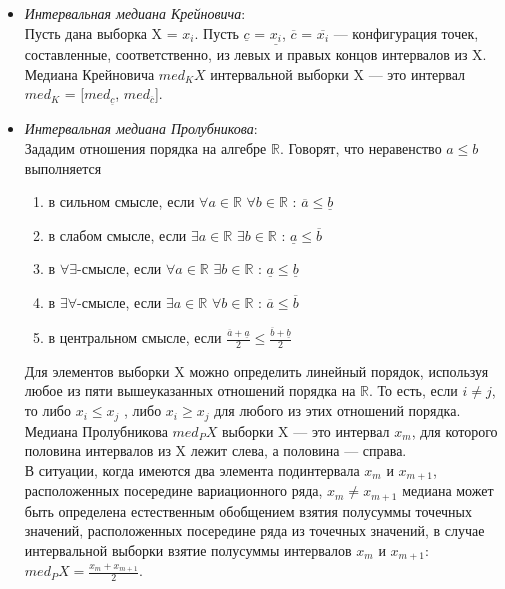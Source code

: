 \documentclass[a4paper,12pt]{article}
\begin{document}
\begin{itemize}
\item \textit{Интервальная медиана Крейновича}:\\
Пусть дана выборка X = {$x_i$}. Пусть $\underline{c}$ = {$\underline{x_i}$}, $\overline{c}$ = {$\overline{x_i}$} — конфигурация точек, составленные, соответственно, из левых и правых концов интервалов из X. Медиана Крейновича $med_{K}X$ интервальной выборки X — это интервал\\ $med_K$ = [$med_{\underline{c}}$, $med_{\overline{c}}$].

\item \textit{Интервальная медиана Пролубникова}:\\
Зададим отношения порядка на алгебре $\mathbb{R}$. Говорят, что неравенство $a \leq b$ выполняется\\
\begin{enumerate}
    \item в сильном смысле, если $\forall a \in \mathbb{R}$ $ \forall b \in \mathbb{R}$ : $\overline{a} \leq \underline{b}$
    \item в слабом смысле, если $\exists a \in \mathbb{R}$ $ \exists b \in \mathbb{R}$ : $\underline{a} \leq \overline{b}$
    \item в $\forall \exists$-смысле, если $\forall a \in \mathbb{R} $ $ \exists b \in \mathbb{R}$ : $\underline{a} \leq \underline{b}$
    \item в $\exists \forall$-смысле, если $\exists a \in \mathbb{R}$ $\forall b \in \mathbb{R}$ : $\overline{a} \leq \overline{b}$
    \item в центральном смысле, если $\frac{\overline{a} + \underline{a}}{2} \leq \frac{\overline{b} + \underline{b}}{2}$
\end{enumerate}
Для элементов выборки X можно определить линейный порядок, используя любое из пяти
вышеуказанных отношений порядка на $\mathbb{R}$. То есть, если $i \neq j$, то либо $x_i \leq x_j$ , либо $x_i \geq x_j$ для любого из этих отношений порядка.\\
Медиана Пролубникова $med_{P}{X}$ выборки X — это интервал $x_m$, для которого половина интервалов из X лежит слева, а половина — справа.\\
В ситуации, когда имеются два элемента подинтервала $x_m$ и $x_{m + 1}$, расположенных посередине вариационного ряда, $x_m \neq x_{m + 1}$ медиана может быть определена естественным обобщением взятия полусуммы точечных значений, расположенных посередине ряда из точечных значений, в случае интервальной выборки взятие полусуммы интервалов $x_m$ и $x_{m + 1}$:\\
$med_{P}{X} = \frac{x_m + x_{m + 1}}{2}$.


\end{itemize}
\end{document}
